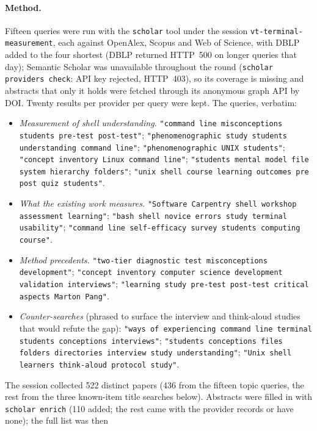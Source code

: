 \paragraph{Method.}
Fifteen queries were run with the \texttt{scholar} tool under the session
\texttt{vt-terminal-measurement}, each against OpenAlex, Scopus and Web of
Science, with DBLP added to the four shortest (DBLP returned HTTP~500 on
longer queries that day); Semantic Scholar was unavailable throughout the
round (\texttt{scholar providers check}: API key rejected, HTTP~403), so
its coverage is missing and abstracts that only it holds were fetched
through its anonymous graph API by DOI.
Twenty results per provider per query were kept.
The queries, verbatim:
\begin{itemize}
  \item \emph{Measurement of shell understanding.}
    \texttt{"command line misconceptions students pre-test post-test"};
    \texttt{"phenomenographic study students understanding command line"};
    \texttt{"phenomenographic UNIX students"};
    \texttt{"concept inventory Linux command line"};
    \texttt{"students mental model file system hierarchy folders"};
    \texttt{"unix shell course learning outcomes pre post quiz students"}.
  \item \emph{What the existing work measures.}
    \texttt{"Software Carpentry shell workshop assessment learning"};
    \texttt{"bash shell novice errors study terminal usability"};
    \texttt{"command line self-efficacy survey students computing course"}.
  \item \emph{Method precedents.}
    \texttt{"two-tier diagnostic test misconceptions development"};
    \texttt{"concept inventory computer science development validation
    interviews"};
    \texttt{"learning study pre-test post-test critical aspects Marton
    Pang"}.
  \item \emph{Counter-searches} (phrased to surface the interview and
    think-aloud studies that would refute the gap):
    \texttt{"ways of experiencing command line terminal students
    conceptions interviews"};
    \texttt{"students conceptions files folders directories interview study
    understanding"};
    \texttt{"Unix shell learners think-aloud protocol study"}.
\end{itemize}
The session collected 522 distinct papers (436 from the fifteen topic queries, the rest from the three known-item title searches below).
Abstracts were filled in with \texttt{scholar enrich} (110 added; the
rest came with the provider records or have none); the full list was then
